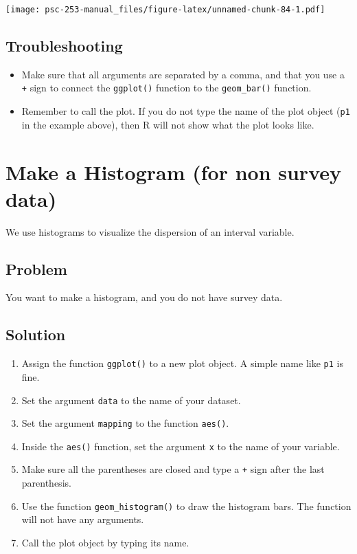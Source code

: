 \documentclass[
]{book}
\providecommand{\tightlist}{%
  \setlength{\itemsep}{0pt}\setlength{\parskip}{0pt}}
\begin{document}
\texttt{[image: psc-253-manual\_files/figure-latex/unnamed-chunk-84-1.pdf]}

\hypertarget{troubleshooting-32}{%
\subsection{Troubleshooting}\label{troubleshooting-32}}

\begin{itemize}
\item
  Make sure that all arguments are separated by a comma, and that you use a \texttt{+} sign to connect the \texttt{ggplot()} function to the \texttt{geom\_bar()} function.
\item
  Remember to call the plot. If you do not type the name of the plot object (\texttt{p1} in the example above), then R will not show what the plot looks like.
\end{itemize}

\hypertarget{histNoSurvey}{%
\section{Make a Histogram (for non survey data)}\label{histNoSurvey}}

We use histograms to visualize the dispersion of an interval variable.

\hypertarget{problem-37}{%
\subsection{Problem}\label{problem-37}}

You want to make a histogram, and you do not have survey data.

\hypertarget{solution-36}{%
\subsection{Solution}\label{solution-36}}

\begin{enumerate}
\def\labelenumi{\arabic{enumi}.}
\tightlist
\item
  Assign the function \texttt{ggplot()} to a new plot object. A simple name like \texttt{p1} is fine.
\item
  Set the argument \texttt{data} to the name of your dataset.
\item
  Set the argument \texttt{mapping} to the function \texttt{aes()}.
\item
  Inside the \texttt{aes()} function, set the argument \texttt{x} to the name of your variable.
\item
  Make sure all the parentheses are closed and type a \texttt{+} sign after the last parenthesis.
\item
  Use the function \texttt{geom\_histogram()} to draw the histogram bars. The function will not have any arguments.
\item
  Call the plot object by typing its name.
\end{enumerate}
\end{document}
